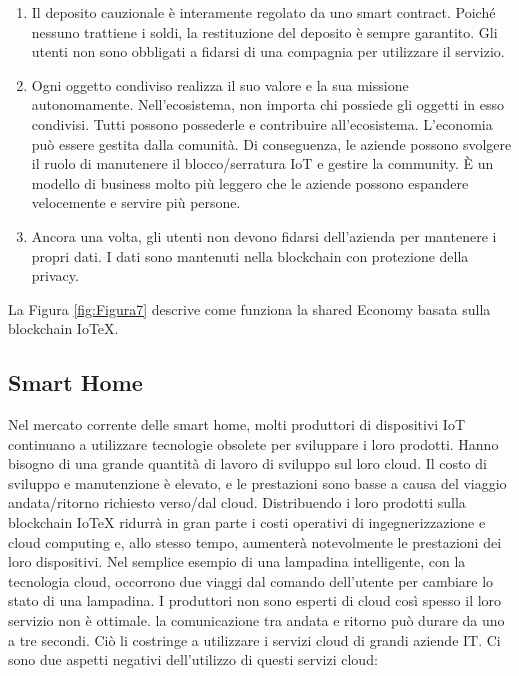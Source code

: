 \begin{enumerate}
    \item Il deposito cauzionale è interamente regolato da uno smart contract. Poiché nessuno trattiene i soldi, la restituzione del deposito è sempre garantito. Gli utenti non sono obbligati a fidarsi di una compagnia per utilizzare il servizio.

    \item Ogni oggetto condiviso realizza il suo valore e la sua missione autonomamente. Nell'ecosistema, non importa chi possiede gli oggetti in esso condivisi. Tutti possono possederle e contribuire all'ecosistema. L'economia può essere gestita dalla comunità. Di conseguenza, le aziende possono svolgere il ruolo di manutenere il blocco/serratura IoT e gestire la community. È un modello di business molto più leggero che le aziende possono  espandere velocemente e servire più persone.

    \item Ancora una volta, gli utenti non devono fidarsi dell'azienda per mantenere i propri dati. I dati sono mantenuti nella blockchain con protezione della privacy.
\end{enumerate}

La Figura \ref{fig:Figura7} descrive come funziona la shared Economy basata sulla blockchain IoTeX.

\subsection{Smart Home}

Nel mercato corrente delle smart home, molti produttori di dispositivi IoT continuano a utilizzare tecnologie obsolete per sviluppare i loro prodotti. Hanno bisogno di una grande quantità di lavoro di sviluppo sul loro cloud. Il costo di sviluppo e manutenzione è elevato, e le prestazioni sono basse a causa del viaggio andata/ritorno richiesto verso/dal cloud. Distribuendo i loro prodotti sulla blockchain IoTeX ridurrà in gran parte i costi operativi di ingegnerizzazione e cloud computing e, allo stesso tempo, aumenterà notevolmente le prestazioni dei loro dispositivi. Nel semplice esempio di una lampadina intelligente, con la tecnologia cloud, occorrono due viaggi dal comando dell'utente per cambiare lo stato di una lampadina. I produttori non sono esperti di cloud così spesso il loro servizio non è ottimale. la comunicazione tra andata e ritorno può durare da uno a tre secondi. Ciò li costringe a utilizzare i servizi cloud di grandi aziende IT. Ci sono due aspetti negativi dell'utilizzo di questi servizi cloud:

